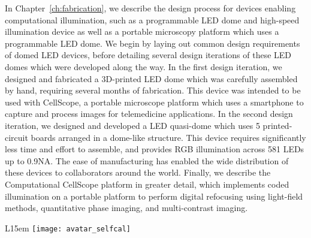In Chapter~\ref{ch:fabrication}, we describe the design process for devices enabling computational illumination, such as a programmable LED dome and high-speed illumination device as well as a portable microscopy platform which uses a programmable LED dome. We begin by laying out common design requirements of domed LED devices, before detailing several design iterations of these LED domes which were developed along the way. In the first design iteration, we designed and fabricated a 3D-printed LED dome which was carefully assembled by hand, requiring several months of fabrication. This device was intended to be used with CellScope, a portable microscope platform which uses a smartphone to capture and process images for telemedicine applications. In the second design iteration, we designed and developed a LED quasi-dome which uses 5 printed-circuit boards arranged in a dome-like structure. This device requires significantly less time and effort to assemble, and provides RGB illumination across 581 LEDs up to 0.9NA. The ease of manufacturing has enabled the wide distribution of these devices to collaborators around the world. Finally, we describe the Computational CellScope platform in greater detail, which implements coded illumination on a portable platform to perform digital refocusing using light-field methods, quantitative phase imaging, and multi-contrast imaging.


\begin{wrapfigure}{L}{15em}
  \texttt{[image: avatar\_selfcal]}
\end{wrapfigure}



